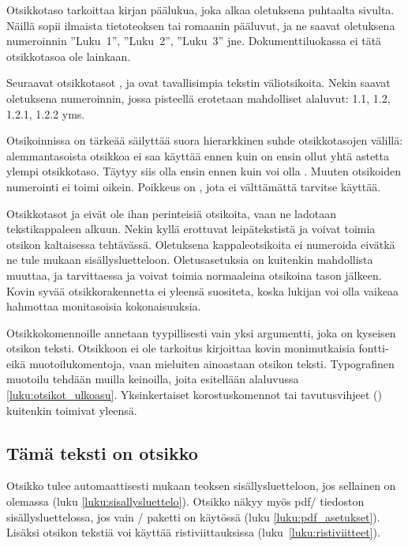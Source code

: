 Otsikkotaso  tarkoittaa kirjan päälukua, joka alkaa
oletuksena puhtaalta sivulta. Näillä sopii ilmaista tietoteoksen tai
romaanin pääluvut, ja ne saavat oletuksena numeroinnin ''Luku~1'',
''Luku~2'', ''Luku~3'' jne. Dokumenttiluokassa  ei tätä
otsikkotasoa ole lainkaan.

Seuraavat otsikkotasot ,  ja
 ovat tavallisimpia tekstin väliotsikoita. Nekin
saavat oletuksena numeroinnin, jossa pisteellä erotetaan mahdolliset
alaluvut: 1.1, 1.2, 1.2.1, 1.2.2 yms.

Otsikoinnissa on tärkeää säilyttää suora hierarkkinen suhde
otsikkotasojen välillä: alemmantasoista otsikkoa ei saa käyttää ennen
kuin on ensin ollut yhtä astetta ylempi otsikkotaso. Täytyy siis olla
ensin  ennen kuin voi olla . Muuten
otsikoiden numerointi ei toimi oikein. Poikkeus on , jota
ei välttämättä tarvitse käyttää.

Otsikkotasot  ja  eivät ole
ihan perinteisiä otsikoita, vaan ne ladotaan tekstikappaleen alkuun.
Nekin kyllä erottuvat leipätekstistä ja voivat toimia otsikon
kaltaisessa tehtävässä. Oletuksena kappaleotsikoita ei numeroida eivätkä
ne tule mukaan sisällysluetteloon. Oletusasetuksia on kuitenkin
mahdollista muuttaa, ja tarvittaessa  ja
 voivat toimia normaaleina otsikoina tason
 jälkeen. Kovin syvää otsikkorakennetta ei
yleensä suositeta, koska lukijan voi olla vaikeaa hahmottaa monitasoisia
kokonaisuuksia.

Otsikkokomennoille annetaan tyypillisesti vain yksi argumentti, joka on
kyseisen otsikon teksti. Otsikkoon ei ole tarkoitus kirjoittaa kovin
monimutkaisia fontti- eikä muotoilukomentoja, vaan mieluiten ainoastaan
otsikon teksti. Typografinen muotoilu tehdään muilla keinoilla, joita
esitellään alaluvussa \ref{luku:otsikot_ulkoasu}. Yksinkertaiset
korostuskomennot tai tavutusvihjeet (\komento{-}) kuitenkin toimivat
yleensä.

\begin{koodilohkosis}
  \section{Tämä teksti on otsikko}
\end{koodilohkosis}

Otsikko tulee automaattisesti mukaan teoksen sisällysluetteloon, jos
sellainen on olemassa (luku \ref{luku:sisallysluettelo}). Otsikko näkyy
myös pdf\-/ tiedoston sisällysluettelossa, jos vain
\-/ paketti on käytössä (luku
\ref{luku:pdf_asetukset}). Lisäksi otsikon tekstiä voi käyttää
ristiviittauksissa (luku~\ref{luku:ristiviitteet}).


